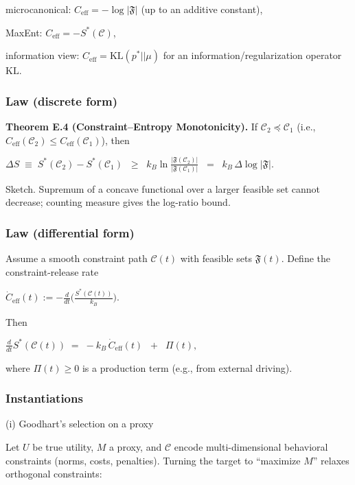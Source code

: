 \documentclass[12pt,a4paper]{article}
\begin{document}
microcanonical: $C_{\mathrm{eff}} = -\log |\mathfrak{F}|$ (up to an additive constant),

MaxEnt: $C_{\mathrm{eff}} = -S^*(\mathcal{C})$,

information view: $C_{\mathrm{eff}} = \mathrm{KL}(p^* || \mu)$ for an information/regularization operator $\mathrm{KL}$.

\subsubsection{Law (discrete form)}

\textbf{Theorem E.4 (Constraint–Entropy Monotonicity).} If $\mathcal{C}_2 \preceq \mathcal{C}_1$ (i.e., $C_{\mathrm{eff}}(\mathcal{C}_2) \leq C_{\mathrm{eff}}(\mathcal{C}_1)$), then

$\Delta S \;\equiv\; S^*(\mathcal{C}_2) - S^*(\mathcal{C}_1) 
\;\;\ge\;\; k_B \ln \frac{|\mathfrak{F}(\mathcal{C}_2)|}{|\mathfrak{F}(\mathcal{C}_1)|}
\;\;=\;\; k_B\,\Delta \log |\mathfrak{F}|.$

Sketch. Supremum of a concave functional over a larger feasible set cannot decrease; counting measure gives the log-ratio bound.

\subsubsection{Law (differential form)}

Assume a smooth constraint path $\mathcal{C}(t)$ with feasible sets $\mathfrak{F}(t)$. Define the constraint-release rate

$\dot C_{\mathrm{eff}}(t) := -\frac{d}{dt}\Big(\frac{S^*(\mathcal{C}(t))}{k_B}\Big).$

Then

$\frac{d}{dt} S^*(\mathcal{C}(t)) \;=\; -k_B\,\dot C_{\mathrm{eff}}(t) \;\;+\;\; \Pi(t),$

where $\Pi(t) \geq 0$ is a production term (e.g., from external driving).

\subsubsection{Instantiations}

(i) Goodhart’s selection on a proxy

Let $U$ be true utility, $M$ a proxy, and $\mathcal{C}$ encode multi-dimensional behavioral constraints (norms, costs, penalties). Turning the target to “maximize $M$” relaxes orthogonal constraints:
\end{document}
